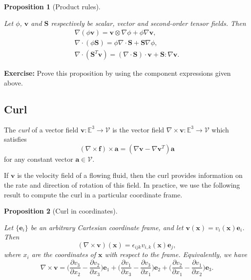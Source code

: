 \documentclass[
  letterpaper,
  DIV=11,
  numbers=noendperiod]{scrreprt}
\theoremstyle{plain}
\newtheorem{proposition}{Proposition}[chapter]
\theoremstyle{remark}
\begin{document}
\begin{proposition}[Product
rules]\protect\hypertarget{prp-productrules}{}\label{prp-productrules}

Let \(\phi\), \({\boldsymbol{v}}\) and \({\boldsymbol{S}}\) respectively
be scalar, vector and second-order tensor fields. Then \[
\begin{gathered}
    \nabla(\phi{\boldsymbol{v}}) = {\boldsymbol{v}}\otimes\nabla\phi+\phi\nabla{\boldsymbol{v}},\\
    \nabla\cdot(\phi{\boldsymbol{S}}) = \phi\nabla\cdot{\boldsymbol{S}}+{\boldsymbol{S}}\nabla\phi,\\
    \nabla\cdot({\boldsymbol{S}}^T{\boldsymbol{v}}) = (\nabla\cdot{\boldsymbol{S}})\cdot{\boldsymbol{v}}+ {\boldsymbol{S}}:\nabla {\boldsymbol{v}}.
\end{gathered}
\]

\end{proposition}

\textbf{Exercise:} Prove this proposition by using the component
expressions given above.

\subsection{Curl}\label{curl}

The \emph{curl} of a vector field
\({\boldsymbol{v}}:{\mathbb{E}}^3\to{\mathcal{V}}\) is the vector field
\(\nabla\times{\boldsymbol{v}}:{\mathbb{E}}^3\to{\mathcal{V}}\) which
satisfies
\[(\nabla\times{\boldsymbol{f}})\times{\boldsymbol{a}}= (\nabla{\boldsymbol{v}}-\nabla {\boldsymbol{v}}^T){\boldsymbol{a}}\]
for any constant vector \({\boldsymbol{a}}\in{\mathcal{V}}\).

If \({\boldsymbol{v}}\) is the velocity field of a flowing fluid, then
the curl provides information on the rate and direction of rotation of
this field. In practice, we use the following result to compute the curl
in a particular coordinate frame.

\begin{proposition}[Curl in
coordinates]\protect\hypertarget{prp-curlincoords}{}\label{prp-curlincoords}

Let \(\{{\boldsymbol{e}}_i\}\) be an arbitrary Cartesian coordinate
frame, and let
\({\boldsymbol{v}}({\boldsymbol{x}}) = v_i({\boldsymbol{x}}){\boldsymbol{e}}_i\).
Then
\[(\nabla\times{\boldsymbol{v}})({\boldsymbol{x}}) = \epsilon_{ijk}v_{i,k}({\boldsymbol{x}}){\boldsymbol{e}}_j,\]
where \(x_i\) are the coordinates of \({\boldsymbol{x}}\) with respect
to the frame. Equivalently, we have
\[\nabla\times{\boldsymbol{v}}= \bigg(\frac{\partial v_3}{\partial x_2}-\frac{\partial v_2}{\partial x_3}\bigg){\boldsymbol{e}}_1+\bigg(\frac{\partial v_1}{\partial x_3}-\frac{\partial v_3}{\partial x_1}\bigg){\boldsymbol{e}}_2+\bigg(\frac{\partial v_2}{\partial x_1}-\frac{\partial v_1}{\partial x_2}\bigg){\boldsymbol{e}}_3.\]

\end{proposition}
\end{document}
